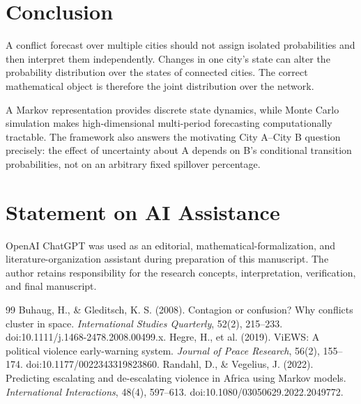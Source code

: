 \documentclass[11pt,letterpaper]{article}
\begin{document}
\section{Conclusion}
A conflict forecast over multiple cities should not assign isolated probabilities and then interpret them independently. Changes in one city's state can alter the probability distribution over the states of connected cities. The correct mathematical object is therefore the joint distribution over the network.

A Markov representation provides discrete state dynamics, while Monte Carlo simulation makes high-dimensional multi-period forecasting computationally tractable. The framework also answers the motivating City A--City B question precisely: the effect of uncertainty about A depends on B's conditional transition probabilities, not on an arbitrary fixed spillover percentage.

\section*{Statement on AI Assistance}
OpenAI ChatGPT was used as an editorial, mathematical-formalization, and literature-organization assistant during preparation of this manuscript. The author retains responsibility for the research concepts, interpretation, verification, and final manuscript.

\begin{thebibliography}{99}
 Buhaug, H., \& Gleditsch, K. S. (2008). Contagion or confusion? Why conflicts cluster in space. \emph{International Studies Quarterly}, 52(2), 215--233. doi:10.1111/j.1468-2478.2008.00499.x.
 Hegre, H., et al. (2019). ViEWS: A political violence early-warning system. \emph{Journal of Peace Research}, 56(2), 155--174. doi:10.1177/0022343319823860.
 Randahl, D., \& Vegelius, J. (2022). Predicting escalating and de-escalating violence in Africa using Markov models. \emph{International Interactions}, 48(4), 597--613. doi:10.1080/03050629.2022.2049772.
\end{thebibliography}
\end{document}

